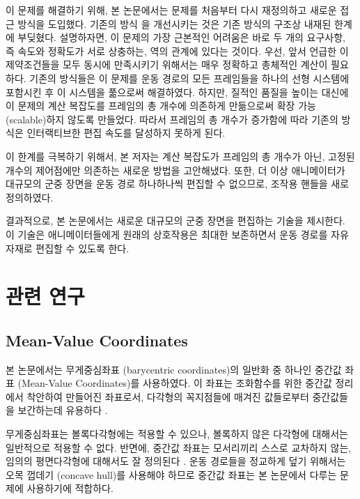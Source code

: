 \documentclass[12pt,a4paper,oneside,draft]{report}
\newcommand{\Floater}{\cite{Floater200319}}
\newcommand{\Hormann}{\cite{Hormann:2006:MVC:1183287.1183295}}
\begin{document}
이 문제를 해결하기 위해, 본 논문에서는 문제를 처음부터 다시 재정의하고 새로운
접근 방식을 도입했다. 기존의 방식 \cite{Kim:2009:SMM:1531326.1531385}을
개선시키는 것은 기존 방식의 구조상 내재된 한계에 부딪혔다.  설명하자면, 이
문제의 가장 근본적인 어려움은 바로 두 개의 요구사항, 즉 속도와 정확도가 서로
상충하는, 역의 관계에 있다는 것이다. 우선, 앞서 언급한 이 제약조건들을 모두
동시에 만족시키기 위해서는 매우 정확하고 총체적인 계산이 필요하다.  기존의
방식들은 이 문제를 운동 경로의 모든 프레임들을 하나의 선형 시스템에 포함시킨 후
이 시스템을 풂으로써 해결하였다. 하지만, 질적인 품질을 높이는 대신에 이 문제의
계산 복잡도를 프레임의 총 개수에 의존하게 만듦으로써 확장 가능 (scalable)하지
않도록 만들었다. 따라서 프레임의 총 개수가 증가함에 따라 기존의 방식은
인터랙티브한 편집 속도를 달성하지 못하게 된다.

이 한계를 극복하기 위해서, 본 저자는 계산 복잡도가 프레임의 총 개수가 아닌,
고정된 개수의 제어점에만 의존하는 새로운 방법을 고안해냈다. 또한, 더 이상
애니메이터가 대규모의 군중 장면을 운동 경로 하나하나씩 편집할 수 없으므로,
조작용 핸들을 새로 정의하였다.


결과적으로, 본 논문에서는 새로운 대규모의 군중 장면을 편집하는 기술을 제시한다.
이 기술은 애니메이터들에게 원래의 상호작용은 최대한 보존하면서 운동 경로를
자유자재로 편집할 수 있도록 한다.


\chapter{관련 연구} \section{Mean-Value Coordinates} 본 논문에서는 무게중심좌표
(barycentric coordinates)의 일반화 중 하나인 중간값 좌표 (Mean-Value
Coordinates)를 사용하였다. 이 좌표는 조화함수를 위한 중간값 정리에서 착안하여
만들어진 좌표로서, 다각형의 꼭지점들에 매겨진 값들로부터 중간값들을 보간하는데
유용하다 \Floater.

무게중심좌표는 볼록다각형에는 적용할 수 있으나, 볼록하지 않은 다각형에 대해서는
일반적으로 적용할 수 없다.  반면에, 중간값 좌표는 모서리끼리 스스로 교차하지
않는, 임의의 평면다각형에 대해서도 잘 정의된다 \Hormann. 운동 경로들을 정교하게
덮기 위해서는 오목 껍데기 (concave hull)를 사용해야 하므로 중간값 좌표는 본
논문에서 다루는 문제에 사용하기에 적합하다.

%
\end{document}
